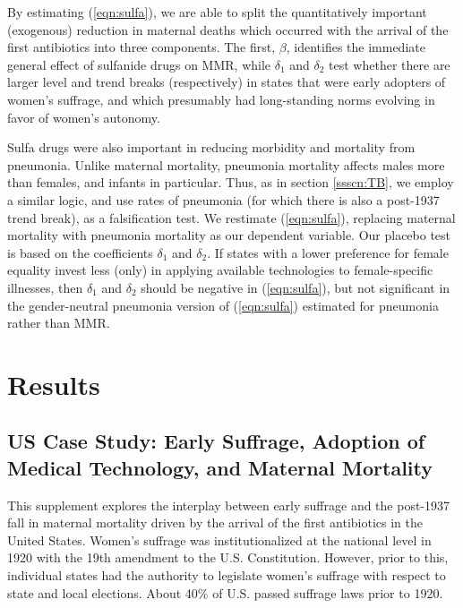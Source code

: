 \documentclass[11pt]{article}
\begin{document}
\begin{spacing}{1.4}
By estimating (\ref{eqn:sulfa}), we are able to split the quantitatively 
important (exogenous) 
reduction in maternal deaths which occurred with the arrival of the first 
antibiotics into three components.  The first, $\beta$, identifies the immediate 
general effect of sulfanide drugs on MMR, while $\delta_1$ and $\delta_2$ test 
whether there are larger level and trend breaks (respectively) in states that 
were early adopters of women's suffrage, and which presumably had long-standing 
norms evolving in favor of women's autonomy.

Sulfa drugs were also important in reducing morbidity and mortality from 
pneumonia.  Unlike maternal mortality, pneumonia mortality affects males 
more than females, and infants in particular.  Thus, as in section 
\ref{ssscn:TB}, we employ a similar logic, and use rates of pneumonia (for 
which there is also a post-1937 trend break), as a falsification test.  We 
restimate (\ref{eqn:sulfa}), replacing maternal mortality with pneumonia 
mortality as our dependent variable.  Our placebo test is based on the 
coefficients $\delta_1$ and $\delta_2$.  If states with a lower preference for 
female equality invest less (only) in applying available technologies to 
female-specific illnesses, then $\delta_1$ and $\delta_2$ should be negative in 
(\ref{eqn:sulfa}), but not significant in the gender-neutral pneumonia version
of (\ref{eqn:sulfa}) estimated for pneumonia rather than MMR.


\section{Results}




\subsection{US Case Study: Early Suffrage, Adoption of Medical 
Technology, and Maternal Mortality}
This supplement explores the interplay between early suffrage and the post-1937 fall in maternal mortality driven by the arrival of the first antibiotics in the United States. Women's suffrage was institutionalized at the national level in 1920 with the 19th amendment to the U.S. Constitution. However, prior to this, individual states had the authority to legislate women's suffrage with respect to state and local elections. About 40\% of U.S. passed suffrage laws prior to 1920. 


\end{spacing}
\end{document}
